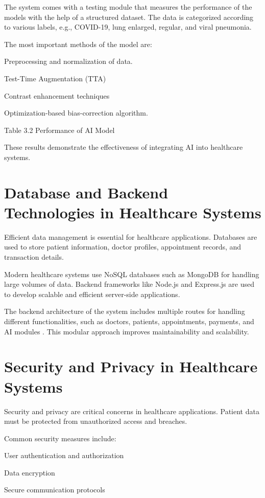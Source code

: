 The system comes with a testing module that measures the performance of the models with the help of a structured dataset. The data is categorized according to various labels, e.g., COVID-19, lung enlarged, regular, and viral pneumonia.

The most important methods of the model are:

Preprocessing and normalization of data.

Test-Time Augmentation (TTA)

Contrast enhancement techniques

Optimization-based bias-correction algorithm.

Table 3.2 Performance of AI Model

These results demonstrate the effectiveness of integrating AI into healthcare systems.

\section{Database and Backend Technologies in Healthcare Systems}

Efficient data management is essential for healthcare applications. Databases are used to store patient information, doctor profiles, appointment records, and transaction details.

Modern healthcare systems use NoSQL databases such as MongoDB for handling large volumes of data. Backend frameworks like Node.js and Express.js are used to develop scalable and efficient server-side applications.

The backend architecture of the system includes multiple routes for handling different functionalities, such as doctors, patients, appointments, payments, and AI modules . This modular approach improves maintainability and scalability.

\section{Security and Privacy in Healthcare Systems}

Security and privacy are critical concerns in healthcare applications. Patient data must be protected from unauthorized access and breaches.

Common security measures include:

User authentication and authorization

Data encryption

Secure communication protocols

